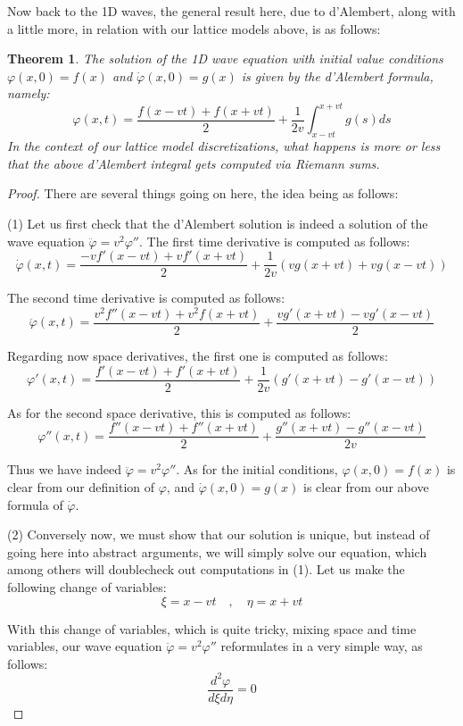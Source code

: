 \documentclass[12pt]{amsbook}
\newtheorem{theorem}{Theorem}[chapter]
\begin{document}
Now back to the 1D waves, the general result here, due to d'Alembert, along with a little more, in relation with our lattice models above, is as follows:


\begin{theorem}
The solution of the 1D wave equation with initial value conditions $\varphi(x,0)=f(x)$ and $\dot{\varphi}(x,0)=g(x)$ is given by the d'Alembert formula, namely:
$$\varphi(x,t)=\frac{f(x-vt)+f(x+vt)}{2}+\frac{1}{2v}\int_{x-vt}^{x+vt}g(s)ds$$
In the context of our lattice model discretizations, what happens is more or less that the above d'Alembert integral gets computed via Riemann sums.
\end{theorem}

\begin{proof}
There are several things going on here, the idea being as follows:

\medskip

(1) Let us first check that the d'Alembert solution is indeed a solution of the wave equation $\ddot{\varphi}=v^2\varphi''$. The first time derivative is computed as follows:
$$\dot{\varphi}(x,t)=\frac{-vf'(x-vt)+vf'(x+vt)}{2}+\frac{1}{2v}(vg(x+vt)+vg(x-vt))$$

The second time derivative is computed as follows:
$$\ddot{\varphi}(x,t)=\frac{v^2f''(x-vt)+v^2f(x+vt)}{2}+\frac{vg'(x+vt)-vg'(x-vt)}{2}$$

Regarding now space derivatives, the first one is computed as follows:
$$\varphi'(x,t)=\frac{f'(x-vt)+f'(x+vt)}{2}+\frac{1}{2v}(g'(x+vt)-g'(x-vt))$$

As for the second space derivative, this is computed as follows:
$$\varphi''(x,t)=\frac{f''(x-vt)+f''(x+vt)}{2}+\frac{g''(x+vt)-g''(x-vt)}{2v}$$

Thus we have indeed $\ddot{\varphi}=v^2\varphi''$. As for the initial conditions, $\varphi(x,0)=f(x)$ is clear from our definition of $\varphi$, and $\dot{\varphi}(x,0)=g(x)$ is clear from our above formula of $\dot{\varphi}$.

\medskip

(2) Conversely now, we must show that our solution is unique, but instead of going here into abstract arguments, we will simply solve our equation, which among others will doublecheck out computations in (1). Let us make the following change of variables:
$$\xi=x-vt\quad,\quad\eta=x+vt$$

With this change of variables, which is quite tricky, mixing space and time variables, our wave equation $\ddot{\varphi}=v^2\varphi''$ reformulates in a very simple way, as follows:
$$\frac{d^2\varphi}{d\xi d\eta}=0$$


\end{proof}
\end{document}
